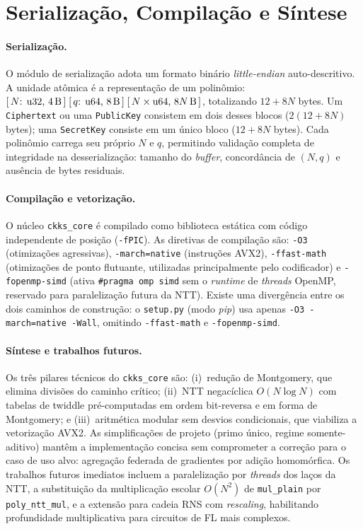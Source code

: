 \documentclass[11pt,a4paper]{article}
\begin{document}
\section{Serialização, Compilação e Síntese}
\label{sec:serial_build}

\paragraph{Serialização.}
O módulo de serialização adota um formato binário \emph{little-endian} auto-descritivo.
A unidade atômica é a representação de um polinômio:
$[\,N\text{: u32, 4\,B}\,]\;[\,q\text{: u64, 8\,B}\,]\;[\,N \times\text{u64, }8N\text{\,B}\,]$,
totalizando $12 + 8N$ bytes. Um \texttt{Ciphertext} ou uma \texttt{PublicKey} consistem
em dois desses blocos ($2(12+8N)$ bytes); uma \texttt{SecretKey} consiste em um único
bloco ($12+8N$ bytes). Cada polinômio carrega seu próprio $N$ e $q$, permitindo
validação completa de integridade na desserialização: tamanho do \emph{buffer},
concordância de $(N,q)$ e ausência de bytes residuais.

\paragraph{Compilação e vetorização.}
O núcleo \texttt{ckks\_core} é compilado como biblioteca estática com código independente
de posição (\texttt{-fPIC}). As diretivas de compilação são: \texttt{-O3} (otimizações
agressivas), \texttt{-march=native} (instruções AVX2), \texttt{-ffast-math}
(otimizações de ponto flutuante, utilizadas principalmente pelo codificador) e
\texttt{-fopenmp-simd} (ativa \texttt{\#pragma omp simd} sem o \emph{runtime} de
\emph{threads} OpenMP, reservado para paralelização futura da NTT). Existe uma
divergência entre os dois caminhos de construção: o \texttt{setup.py} (modo
\emph{pip}) usa apenas \texttt{-O3 -march=native -Wall}, omitindo
\texttt{-ffast-math} e \texttt{-fopenmp-simd}.

\paragraph{Síntese e trabalhos futuros.}
Os três pilares técnicos do \texttt{ckks\_core} são: (i)~redução de Montgomery, que
elimina divisões do caminho crítico; (ii)~NTT negacíclica $O(N\log N)$ com tabelas de
twiddle pré-computadas em ordem bit-reversa e em forma de Montgomery; e (iii)~aritmética
modular sem desvios condicionais, que viabiliza a vetorização AVX2. As simplificações
de projeto (primo único, regime somente-aditivo) mantêm a implementação concisa sem
comprometer a correção para o caso de uso alvo: agregação federada de gradientes por
adição homomórfica. Os trabalhos futuros imediatos incluem a paralelização por
\emph{threads} dos laços da NTT, a substituição da multiplicação escolar $O(N^2)$ de
\texttt{mul\_plain} por \texttt{poly\_ntt\_mul}, e a extensão para cadeia RNS com
\emph{rescaling}, habilitando profundidade multiplicativa para circuitos de FL mais
complexos.
\end{document}
